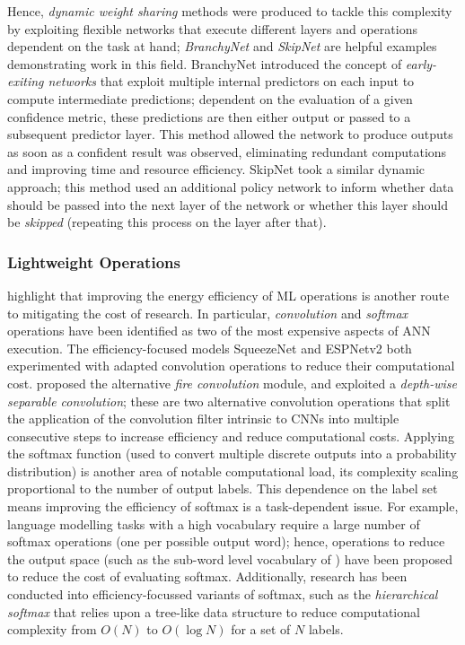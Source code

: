 \documentclass[a4paper, 12pt]{article}
\begin{document}
    Hence, \emph{dynamic weight sharing} methods were produced to tackle this complexity by exploiting flexible networks that execute different layers and operations dependent on the task at hand; \emph{BranchyNet} \citep{teerapittayanon-2017} and \emph{SkipNet} \citep{wang-2017} are helpful examples demonstrating work in this field. BranchyNet introduced the concept of \emph{early-exiting networks} that exploit multiple internal predictors on each input to compute intermediate predictions; dependent on the evaluation of a given confidence metric, these predictions are then either output or passed to a subsequent predictor layer. This method allowed the network to produce outputs as soon as a confident result was observed, eliminating redundant computations and improving time and resource efficiency. SkipNet took a similar dynamic approach; this method used an additional policy network to inform whether data should be passed into the next layer of the network or whether this layer should be \emph{skipped} (repeating this process on the layer after that).

    \subsubsection{Lightweight Operations}

    \citet{xu-2021} highlight that improving the energy efficiency of ML operations is another route to mitigating the cost of research. In particular, \emph{convolution} and \emph{softmax} operations have been identified as two of the most expensive aspects of ANN execution. The efficiency-focused models SqueezeNet \citep{iandola-2016} and ESPNetv2 \citep{mehta-2018} both experimented with adapted convolution operations to reduce their computational cost. \citet{iandola-2016} proposed the alternative \emph{fire convolution} module, and \citet{mehta-2018} exploited a \emph{depth-wise separable convolution}; these are two alternative convolution operations that split the application of the convolution filter intrinsic to CNNs into multiple consecutive steps to increase efficiency and reduce computational costs. Applying the softmax function (used to convert multiple discrete outputs into a probability distribution) is another area of notable computational load, its complexity scaling proportional to the number of output labels. This dependence on the label set means improving the efficiency of softmax is a task-dependent issue. For example, language modelling tasks with a high vocabulary require a large number of softmax operations (one per possible output word); hence, operations to reduce the output space (such as the sub-word level vocabulary of \citet{sennrich-2015}) have been proposed to reduce the cost of evaluating softmax. Additionally, research has been conducted into efficiency-focussed variants of softmax, such as the \emph{hierarchical softmax} \citep{morin-bengio-2005} that relies upon a tree-like data structure to reduce computational complexity from $O(N)$ to $O(\log N)$ for a set of $N$ labels.
\end{document}
